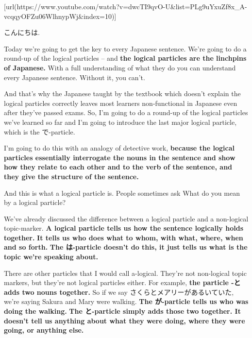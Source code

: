 \startsectionlevel[title={{\bf 8b. Particles explained.}},reference={b.-particles-explained.}]

[url(https://www.youtube.com/watch?v=dwcTI9qvO-U&list=PLg9uYxuZf8x_A-vcqqyOFZu06WlhnypWj&index=10)]

こんにちは.

Today we're going to get the key to every Japanese sentence. We're going to do a round-up of the logical particles -- and {\bf the logical particles are the linchpins of Japanese.} With a full understanding of what they do you can understand every Japanese sentence. Without it, you can't.

And that's why the Japanese taught by the textbook which doesn't explain the logical particles correctly leaves most learners non-functional in Japanese even after they've passed exams. So, I'm going to do a round-up of the logical particles we've learned so far and I'm going to introduce the last major logical particle, which is the で-particle.

I'm going to do this with an analogy of detective work, {\bf because the logical particles essentially interrogate the nouns in the sentence and show how they relate to each other and to the verb of the sentence, and they give the structure of the sentence.}

{}

And this is what a logical particle is. People sometimes ask What do you mean by a logical particle?

{}

We've already discussed the difference between a logical particle and a non-logical topic-marker. {\bf A logical particle tells us how the sentence logically holds together.} {\bf It tells us who does what to whom, with what, where, when and so forth.} {\bf The は-particle doesn't do this, it just tells us what is the topic we're speaking about.}

\thinrule

There are other particles that I would call a-logical. They're not non-logical topic markers, but they're not logical particles either. For example, {\bf the particle -と adds two nouns together.} So if we say さくらとメアリーがあるいていた, we're saying Sakura and Mary were walking. {\bf The が-particle tells us who was doing the walking.} {\bf The と-particle simply adds those two together. It doesn't tell us anything about what they were doing, where they were going, or anything else.}

